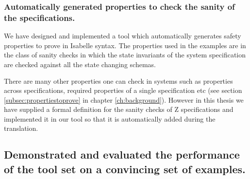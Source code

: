 %

\subsubsection{Automatically generated properties to check the sanity of the specifications.}
We have designed and
implemented a tool which automatically generates safety properties to prove in
Isabelle syntax. The properties used in the examples are in the class of sanity
checks in which the state invariants of the system specification are checked
against all the state changing schemas.

There are many other properties one can check in systems such as properties
across specifications, required properties of a single specification etc (see
section \ref{subsec:propertiestoprove} in chapter \ref{ch:background}).
However in this thesis we have supplied a formal definition for the sanity
checks of Z specifications and implemented it in our tool so that it is
automatically added during the translation.


\subsection{Demonstrated and evaluated the performance of the tool set on a convincing set of examples.}

